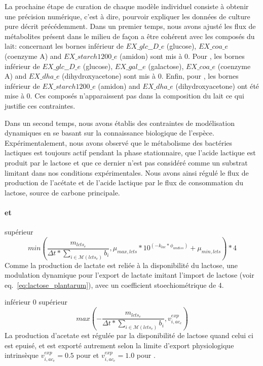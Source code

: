 \documentclass[../main.tex]{subfiles}
\begin{document}
La prochaine étape de curation de chaque modèle individuel consiste à obtenir une précision numérique, c'est à dire, pourvoir expliquer les données de culture pure décrit précédemment. Dans un premier temps, nous avons ajusté les flux de métabolites présent dans le milieu de façon a être cohérent avec les composés du lait: concernant \lactis les bornes inférieur de $EX\_glc\_\_D\_e$ (glucose), $EX\_coa\_e$ (coenzyme A) and $EX\_starch1200\_e$ (amidon) sont mis à 0. Pour \plantarum, les bornes inférieur de $EX\_glc\_\_D\_e$ (glucose), $EX\_gal\_\_e$ (galactose), $EX\_coa\_e$ (coenzyme A) and $EX\_dha\_e$ (dihydroxyacetone) sont mis à 0. Enfin, pour \freud, les bornes inférieur de $EX\_starch1200\_e$ (amidon) and $EX\_dha\_e$ (dihydroxyacetone) ont été mise à 0. Ces composés n'apparaissent pas dans la composition du lait ce qui justifie ces contraintes. 

Dans un second temps, nous avons établis des contraintes de modélisation dynamiques en se basant sur la connaissance biologique de l'espèce. Expérimentalement, nous avons observé que le métabolisme des bactéries lactiques est toujours actif pendant la phase stationnaire, que l'acide lactique est produit par le lactose et que ce dernier n'est pas considéré comme un substrat limitant dans nos conditions expérimentales. Nous avons ainsi régulé le flux de production de l'acétate et de l'acide lactique par le flux de consommation du lactose, source de carbone principale. 

\paragraph*{\lactis et \plantarum}
\begin{itemize}
{supérieur}
{
\begin{equation}
min(\frac{m_{lcts_e}}{\Delta t*\sum_{i \in \mathcal{M}(lcts_e)} b_i},\mu_{max,lcts}*10^{(-k_{lac}*\phi_{undiss})}+\mu_{min,lcts})*4
\label{eq:lactate_lactis}
\end{equation}
}{
Comme la production de lactate est reliée à la disponibilité du lactose, une modulation dynamique pour l'export de lactate imitant l'import de lactose (voir eq.~\eqref{eq:lactose_plantarum}), avec un coefficient stoechiométrique de 4.
}

{inférieur}
{0
}
{supérieur}
{
\begin{equation*}
max(-\frac{m_{lcts_e}}{\Delta t*\sum_{i \in \mathcal{M}(lcts_e)} b_i},v^{exp}_{i,ac_e})
\end{equation*}
}
{
La production d'acetate est régulée par la disponibilité de lactose quand celui ci est epuisé, et est exporté autrement selon la limite d'export physiologique intrinsèque $v^{exp}_{i,ac_e}=0.5$ pour \lactis et $v^{exp}_{i,ac_e}=1.0$ pour \plantarum.}
\end{itemize}
\end{document}
